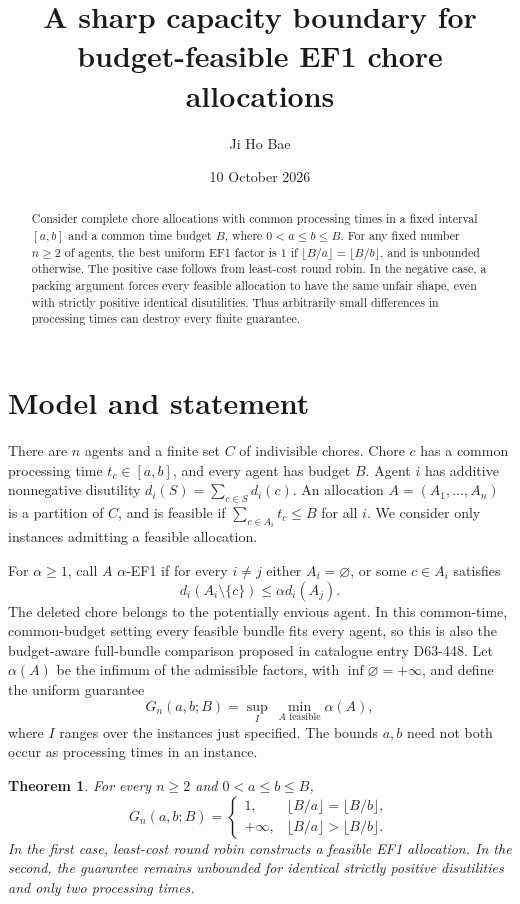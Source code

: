 \documentclass[11pt]{article}
\title{A sharp capacity boundary for budget-feasible EF1 chore allocations}
\author{Ji Ho Bae}
\date{10 October 2026}
\newtheorem{theorem}{Theorem}
\begin{document}
\maketitle
\begin{abstract}
Consider complete chore allocations with common processing times in a fixed
interval $[a,b]$ and a common time budget $B$, where $0<a\le b\le B$.
For any fixed number $n\ge2$ of agents, the best uniform EF1 factor is $1$
if $\lfloor B/a\rfloor=\lfloor B/b\rfloor$, and is unbounded otherwise.
The positive case follows from least-cost round robin. In the negative case,
a packing argument forces every feasible allocation to have the same unfair
shape, even with strictly positive identical disutilities. Thus arbitrarily
small differences in processing times can destroy every finite guarantee.
\end{abstract}

\section{Model and statement}

There are $n$ agents and a finite set $C$ of indivisible chores. Chore $c$
has a common processing time $t_c\in[a,b]$, and every agent has budget $B$.
Agent $i$ has additive nonnegative disutility
$d_i(S)=\sum_{c\in S}d_i(c)$. An allocation $A=(A_1,\ldots,A_n)$ is a
partition of $C$, and is feasible if $\sum_{c\in A_i}t_c\le B$ for all $i$.
We consider only instances admitting a feasible allocation.

For $\alpha\ge1$, call $A$ $\alpha$-EF1 if for every $i\ne j$ either
$A_i=\varnothing$, or some $c\in A_i$ satisfies
\[
                     d_i(A_i\setminus\{c\})\le\alpha d_i(A_j).
\]
The deleted chore belongs to the potentially envious agent. In this common-time,
common-budget setting every feasible bundle fits every agent, so this is also
the budget-aware full-bundle comparison proposed in catalogue entry D63-448.
Let $\alpha(A)$ be the infimum of the admissible factors, with
$\inf\varnothing=+\infty$, and define the uniform guarantee
\[
 G_n(a,b;B)=\sup_I\ \min_{A\text{ feasible}}\alpha(A),
\]
where $I$ ranges over the instances just specified. The bounds $a,b$ need not
both occur as processing times in an instance.

\begin{theorem}\label{thm:boundary}
For every $n\ge2$ and $0<a\le b\le B$,
\[
 G_n(a,b;B)=
 \begin{cases}
  1,&\lfloor B/a\rfloor=\lfloor B/b\rfloor,\\
  +\infty,&\lfloor B/a\rfloor>\lfloor B/b\rfloor.
 \end{cases}
\]
In the first case, least-cost round robin constructs a feasible EF1 allocation.
In the second, the guarantee remains unbounded for identical strictly positive
disutilities and only two processing times.
\end{theorem}
\end{document}
